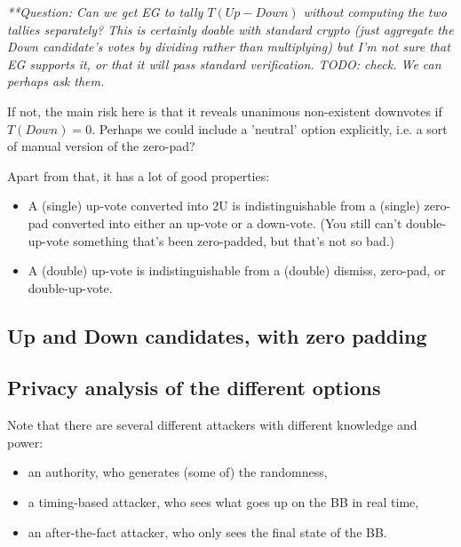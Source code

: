 \documentclass[10pt,a4paper]{article}
\begin{document}
\textit{**Question: Can we get EG to tally $T(\textit{Up} - \textit{Down})$ without computing the two tallies separately? This is certainly doable with standard crypto (just aggregate the Down candidate's votes by dividing rather than multiplying) but I'm not sure that EG supports it, or that it will pass standard verification. TODO: check.  We can perhaps ask them.}

If not, the main risk here is that it reveals unanimous non-existent downvotes if $T(\textit{Down}) = 0$. Perhaps we could include a 'neutral' option explicitly, i.e. a sort of manual version of the zero-pad?

Apart from that, it has a lot of good properties:
\begin{itemize}
	\item A (single) up-vote converted into 2U is indistinguishable from a (single) zero-pad converted into either an up-vote or a down-vote. (You still can't double-up-vote something that's been zero-padded, but that's not so bad.)
	\item A (double) up-vote is indistinguishable from a (double) dismiss, zero-pad, or double-up-vote.
\end{itemize}
\subsection{Up and Down candidates, with zero padding}


\subsection{Privacy analysis of the different options}
Note that there are several different attackers with different knowledge and power:
\begin{itemize}
	\item an authority, who generates (some of) the randomness,
	\item a timing-based attacker, who sees what goes up on the BB in real time,
	\item an after-the-fact attacker, who only sees the final state of the BB.
\end{itemize}


\end{document}
